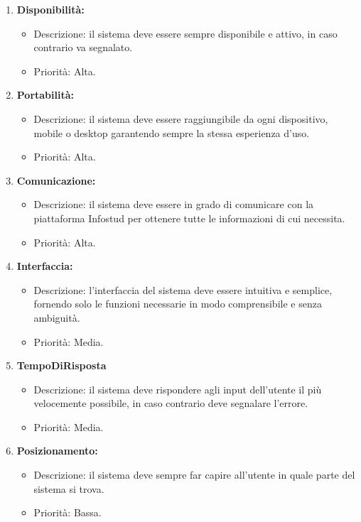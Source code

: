 \begin{enumerate}

\item \textbf{Disponibilità:}
\begin{itemize}
\item Descrizione: il sistema deve essere sempre disponibile e attivo, in caso contrario va segnalato.
\item	Priorità: Alta.
\end{itemize}


\item \textbf{Portabilità:}
\begin{itemize}
\item Descrizione:  il sistema deve essere raggiungibile da ogni dispositivo, mobile o desktop garantendo sempre la stessa esperienza d’uso.
\item	Priorità: Alta.
\end{itemize}


\item \textbf{Comunicazione:}
\begin{itemize}
\item  Descrizione:  il sistema deve essere in grado di comunicare con la piattaforma Infostud per ottenere tutte le informazioni di cui necessita.
\item	Priorità: Alta.
\end{itemize}

\item \textbf{Interfaccia:}
\begin{itemize}
\item  Descrizione:  l’interfaccia del sistema deve essere intuitiva e semplice,  fornendo solo le funzioni necessarie in modo comprensibile e senza ambiguità.
\item	Priorità: Media.
\end{itemize}


\item \textbf{TempoDiRisposta}
\begin{itemize}
\item  Descrizione:  il sistema deve rispondere agli input dell’utente il più velocemente possibile, in caso contrario deve segnalare l’errore.
\item	Priorità: Media.
\end{itemize}


\item \textbf{Posizionamento:}
\begin{itemize}
\item Descrizione:  il sistema deve sempre far capire all’utente in quale parte del sistema si trova.
\item	Priorità: Bassa.
\end{itemize}

\end{enumerate}



